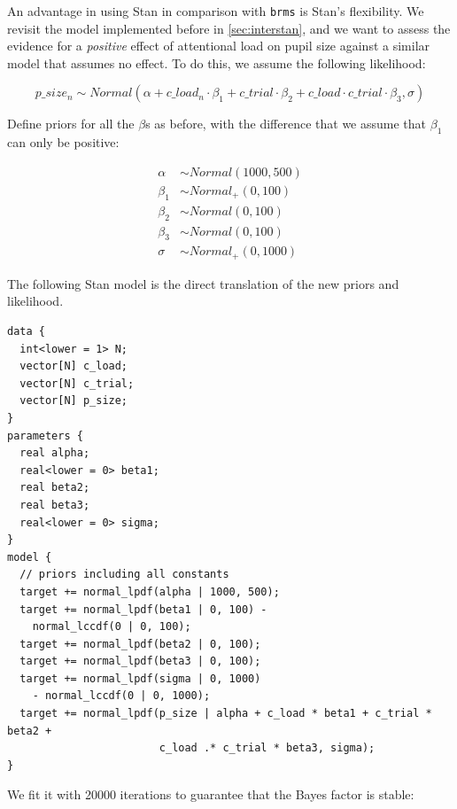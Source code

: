 \documentclass[12pt,]{krantz}
\theoremstyle{definition}
\theoremstyle{definition}
\theoremstyle{definition}
\theoremstyle{remark}
\begin{document}
An advantage in using Stan in comparison with \texttt{brms} is Stan's flexibility. We revisit the model implemented before in \ref{sec:interstan}, and we want to assess the evidence for a \emph{positive} effect of attentional load on pupil size against a similar model that assumes no effect. To do this, we assume the following likelihood:

\begin{equation}
p\_size_n \sim Normal(\alpha + c\_load_n \cdot \beta_1 + c\_trial \cdot \beta_2 + c\_load \cdot c\_trial \cdot \beta_3, \sigma)
\end{equation}

Define priors for all the \(\beta\)s as before, with the difference that we assume that \(\beta_1\) can only be positive:

\begin{equation}
\begin{aligned}
\alpha &\sim Normal(1000, 500) \\
\beta_1 &\sim Normal_+(0, 100) \\
\beta_2 &\sim Normal(0, 100) \\
\beta_3 &\sim Normal(0, 100) \\
\sigma &\sim Normal_+(0, 1000)
\end{aligned}
\end{equation}

The following Stan model is the direct translation of the new priors and likelihood.

\begin{verbatim}
data {
  int<lower = 1> N;
  vector[N] c_load;
  vector[N] c_trial;
  vector[N] p_size;
}
parameters {
  real alpha;
  real<lower = 0> beta1;
  real beta2;
  real beta3;
  real<lower = 0> sigma;
}
model {
  // priors including all constants
  target += normal_lpdf(alpha | 1000, 500);
  target += normal_lpdf(beta1 | 0, 100) -
    normal_lccdf(0 | 0, 100);
  target += normal_lpdf(beta2 | 0, 100);
  target += normal_lpdf(beta3 | 0, 100);
  target += normal_lpdf(sigma | 0, 1000)
    - normal_lccdf(0 | 0, 1000);
  target += normal_lpdf(p_size | alpha + c_load * beta1 + c_trial * beta2 +
                        c_load .* c_trial * beta3, sigma);
}
\end{verbatim}

We fit it with 20000 iterations to guarantee that the Bayes factor is stable:
\end{document}
